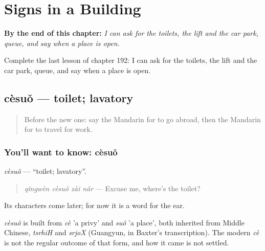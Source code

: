 
\chapter{Signs in a Building}
\label{ch:zh-signs-in-a-building}

\begin{chapteropening}
\textbf{By the end of this chapter:} \emph{I can ask for the toilets, the lift and the car park, queue, and say when a place is open.}

Complete the last lesson of chapter 192: I can ask for the toilets, the lift and the car park, queue, and say when a place is open.
\end{chapteropening}

\section[cèsuǒ]{cèsuǒ — toilet; lavatory}

\label{lesson:ZH-C192-cesuo}



\begin{quote}
Before the new one: say the Mandarin for to go abroad, then the Mandarin for to travel for work.
\end{quote}

\subsection*{You'll want to know: cèsuǒ}
\emph{cèsuǒ} — \textquotedblleft{}toilet; lavatory\textquotedblright{}.

\begin{quote}
\emph{qǐngwèn cèsuǒ zài nǎr} — Excuse me, where's the toilet?
\end{quote}

Its characters come later; for now it is a word for the ear.

\begin{cousinweb}
\emph{cèsuǒ} is built from \emph{cè} 'a privy' and \emph{suǒ} 'a place', both inherited from Middle Chinese, \emph{tsrhiH} and \emph{srjoX} (Guangyun, in Baxter's transcription). The modern \emph{cè} is not the regular outcome of that form, and how it came is not settled.
\end{cousinweb}

